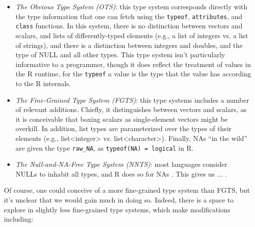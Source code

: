 \documentclass[acmsmall,10pt,review,anonymous]{acmart}\settopmatter{printfolios=true,printccs=false,printacmref=false}
\begin{document}
\begin{itemize}

\item {\it The Obvious Type System (OTS)}: this type system corresponds directly with the type information that one can fetch using the {\tt typeof}, {\tt attributes}, and {\tt class} functions.
In this system, there is no distinction between vectors and scalars, and lists of differently-typed elements (e.g., a list of integers vs. a list of strings), and there is a distinction between integers and doubles, and the type of NULL and all other types.
This type system isn't particularly informative to a programmer, though it does reflect the treatment of values in the R runtime, for the {\tt typeof} a value is the type that the value has according to the R internals.

\item {\it The Fine-Grained Type System (FGTS)}: this type systems includes a number of relevant additions.
Chiefly, it distinguishes between vectors and scalars, as it is conceivable that boxing scalars as single-element vectors might be overkill.
In addition, list types are parameterized over the types of their elements (e.g., list<integer> vs. list<character>).
Finally, NAs ``in the wild'' are given the type {\tt raw\_NA}, as {\tt typeof(NA) = logical} in R.

\item {\it The Null-and-NA-Free Type System (NNTS)}: most languages consider NULLs to inhabit all types, and R does so for NAs .
This gives us ... .

\end{itemize}

Of course, one could conceive of a more fine-grained type system than FGTS, but it's unclear that we would gain much in doing so.
Indeed, there is a space to explore in slightly less fine-grained type systems, which make modifications including:
\end{document}
